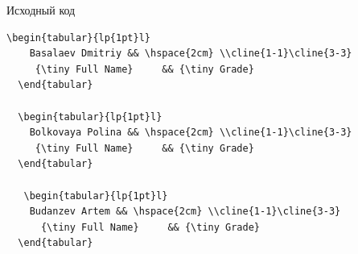 \documentclass{beamer}[aspectratio=169]
\begin{document}
\begin{frame}[fragile]{Исходный код}
\begin{adjustbox}{scale=0.65}
\begin{large}
\transwipe

 \begin{lstlisting}[language=Tex]
  \begin{tabular}{lp{1pt}l} 
    Basalaev Dmitriy && \hspace{2cm} \\cline{1-1}\cline{3-3} 
     {\tiny Full Name}     && {\tiny Grade}
  \end{tabular}

  \begin{tabular}{lp{1pt}l} 
    Bolkovaya Polina && \hspace{2cm} \\cline{1-1}\cline{3-3} 
     {\tiny Full Name}     && {\tiny Grade}
  \end{tabular}

   \begin{tabular}{lp{1pt}l} 
    Budanzev Artem && \hspace{2cm} \\cline{1-1}\cline{3-3} 
      {\tiny Full Name}     && {\tiny Grade} 
  \end{tabular}

\end{lstlisting}
\end{large}
\end{adjustbox}




\end{frame}
\end{document}
